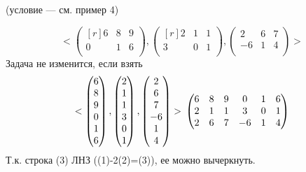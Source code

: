 \begin{prim}
(условие --- см. пример 4)
\end{prim}
$$<
	\begin{pmatrix*}[r]
	 6 & 8 & 9 \\
	 0 & 1 & 6 \\
	\end{pmatrix*} 
,
	\begin{pmatrix*}[r]
	 2 & 1 & 1 \\
	 3 & 0 & 1 \\
	\end{pmatrix*} 
,
	\begin{pmatrix*} %
	 2 & 6 & 7 \\
	 -6 & 1 & 4 \\
	\end{pmatrix*} 
>$$
Задача не изменится, если взять
$$<
	\begin{pmatrix*}[r]
	 6 \\ 
	 8 \\ 
	 9 \\
	 0 \\ 
	 1 \\ 
	 6 \\
	\end{pmatrix*} 
,
	\begin{pmatrix*}[r]
	 2 \\ 
	 1 \\ 
	 1 \\
	 3 \\ 
	 0 \\ 
	 1 \\
	\end{pmatrix*} 
,
	\begin{pmatrix*}
	 2 \\ 
	 6 \\ 
	 7 \\
	 -6 \\ 
	 1 \\ 
	 4 \\
	\end{pmatrix*} 
> \\
\begin{pmatrix*}
	 6 & 8 & 9 & 0 & 1 & 6 \\
	 2 & 1 & 1 & 3 & 0 & 1 \\
	 2 & 6 & 7 & -6 & 1 & 4 \\
	\end{pmatrix*} 
$$
Т.к. строка (3) ЛНЗ ((1)-2(2)=(3)), ее можно вычеркнуть.\\
